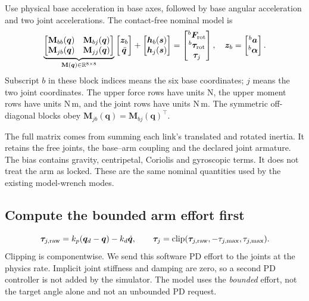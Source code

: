 \documentclass[11pt,a4paper]{article}
\newcommand{\vct}[1]{\boldsymbol{#1}}
\newcommand{\mat}[1]{\mathbf{#1}}
\newcommand{\bv}[1]{{}^{b}\vct{#1}}
\newcommand{\RR}{\mathbb R}
\begin{document}
Use physical base acceleration in base axes, followed by base angular
acceleration and two joint accelerations. The contact-free nominal model is
\begin{equation}
\underbrace{\begin{bmatrix}
\mat M_{bb}(\vct q)&\mat M_{bj}(\vct q)\\
\mat M_{jb}(\vct q)&\mat M_{jj}(\vct q)
\end{bmatrix}}_{\mat M(\vct q)\in\RR^{8\times8}}
\begin{bmatrix}\vct z_b\\\ddot{\vct q}\end{bmatrix}
+\begin{bmatrix}\vct h_b(\vct s)\\\vct h_j(\vct s)\end{bmatrix}
=\begin{bmatrix}\bv F_{\rm rot}\\\bv\tau_{\rm rot}\\\vct\tau_j\end{bmatrix},
\quad
\vct z_b=\begin{bmatrix}\bv a\\\bv\alpha\end{bmatrix}.
\label{eq:fullmodel}
\end{equation}
Subscript $b$ in these block indices means the six base coordinates;
$j$ means the two joint coordinates. The upper force rows have units N, the
upper moment rows have units N\,m, and the joint rows have units N\,m.
The symmetric off-diagonal blocks obey
$\mat M_{jb}(\vct q)=\mat M_{bj}(\vct q)^\top$.

The full matrix comes from summing each link's translated and rotated inertia.
It retains the free joints, the base--arm coupling and the declared joint
armature. The bias contains gravity, centripetal, Coriolis and gyroscopic terms.
It does not treat the arm as locked. These are the same nominal quantities used
by the existing model-wrench modes.

\subsection{Compute the bounded arm effort first}
\begin{equation}
\vct\tau_{j,\rm raw}
=k_p(\vct q_d-\vct q)-k_d\dot{\vct q},\qquad
\vct\tau_j=\operatorname{clip}
(\vct\tau_{j,\rm raw},-\tau_{j,\max},\tau_{j,\max}).
\label{eq:pd}
\end{equation}
Clipping is componentwise. We send this software PD effort to the joints at the
physics rate. Implicit joint stiffness and damping are zero, so a second PD
controller is not added by the simulator. The model uses the \emph{bounded}
effort, not the target angle alone and not an unbounded PD request.
\end{document}
